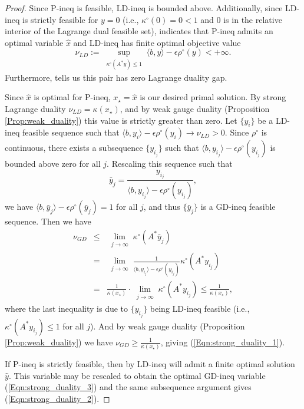 \begin{proof}
Since P-ineq is feasible, LD-ineq is bounded above.  Additionally, since LD-ineq is strictly feasible for $y=0$ (i.e., $\kappa^\circ(0) = 0< 1$ and $0$ is in the relative interior of the Lagrange dual feasible set), \cite[Theorem 28.2]{rockafellar1970convex} indicates that P-ineq admits an optimal variable $\hat{x}$ and LD-ineq has finite optimal objective value  
\begin{equation*}
\nu_{LD} := \sup\limits_{\substack{\kappa^\circ(A^*y) \leq 1}} \langle b, y \rangle - \epsilon \rho^\circ(y)  < +\infty.
\end{equation*}
Furthermore, \cite[Theorem 28.4]{rockafellar1970convex} tells us this pair has zero Lagrange duality gap.

Since $\hat{x}$ is optimal for P-ineq, $x_\star = \hat{x}$ is our desired primal solution.  By strong Lagrange duality $\nu_{LD} = \kappa(x_\star)$,  and by weak gauge duality (Proposition \ref{Prop:weak_duality}) this value is strictly greater than zero.  Let $\{ y_i \}$ be a LD-ineq feasible sequence such that $\langle b, y_i \rangle - \epsilon \rho^\circ(y_i) \rightarrow \nu_{LD} > 0$.  Since $\rho^\circ$ is continuous, there exists a subsequence $\{ y_{i_j} \}$ such that $\langle b, y_{i_j} \rangle - \epsilon \rho^\circ(y_{i_j}) $ is bounded above zero for all $j$.  Rescaling this sequence such that
\begin{equation*}
\bar{y}_j = \frac{y_{i_j}}{\langle b, y_{i_j} \rangle - \epsilon \rho^\circ(y_{i_j})},
\end{equation*}
we have $\langle b, \bar{y}_j \rangle - \epsilon \rho^\circ(\bar{y}_j) = 1$ for all $j$, and thus $\{ \bar{y}_j \}$ is a GD-ineq feasible sequence.  Then we have
\begin{equation*}
\begin{array}{rcl}
\nu_{GD} &	\leq & \lim\limits_{\substack{j \rightarrow \infty}} \kappa^\circ(A^* \bar{y}_j)	\\
	&	=	&	\lim\limits_{\substack{j \rightarrow \infty}}  \frac{1}{ \langle b, y_{i_j} \rangle - \epsilon \rho^\circ(y_{i_j})} \kappa^\circ(A^*y_{i_j}) \\
	&	=	&	\frac{1}{\kappa(x_\star)} \cdot \lim\limits_{\substack{j \rightarrow \infty}}  \kappa^\circ(A^*y_{i_j}) \leq \frac{1}{\kappa(x_\star)},
\end{array}
\end{equation*}
where the last inequality is due to $\{ y_{i_j} \}$ being LD-ineq feasible (i.e., $\kappa^\circ(A^*y_{i_j}) \leq 1$ for all $j$).  And by weak gauge duality (Proposition \ref{Prop:weak_duality}) we have $\nu_{GD} \geq \frac{1}{\kappa(x_\star)}$, giving (\ref{Eqn:strong_duality_1}).

If P-ineq is strictly feasible, then by \cite[Theorem 28.2]{rockafellar1970convex} LD-ineq will admit a finite optimal solution $\hat{y}$. This variable may be rescaled to obtain the optimal GD-ineq variable (\ref{Eqn:strong_duality_3}) and the same subsequence argument gives (\ref{Eqn:strong_duality_2}).

\end{proof}
